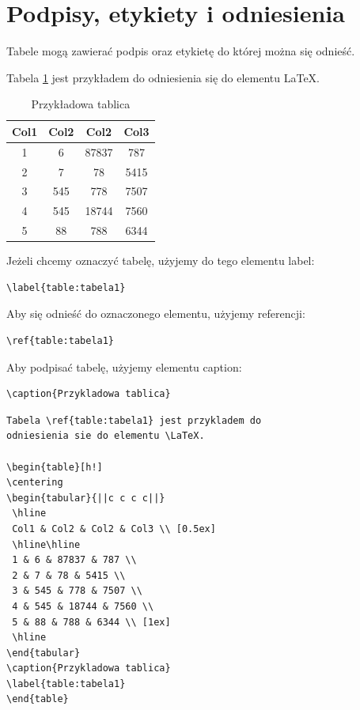 \documentclass[table]{beamer}
\begin{document}
\section{Podpisy, etykiety i odniesienia}
\begin{frame}
Tabele mogą zawierać podpis oraz etykietę do której można się odnieść.

Tabela \ref{table:tabela1} jest przykładem do odniesienia się do elementu \LaTeX.

\begin{table}[h!]
\centering
\begin{tabular}{||c c c c||} 
 \hline
 Col1 & Col2 & Col2 & Col3 \\ [0.5ex] 
 \hline\hline
 1 & 6 & 87837 & 787 \\ 
 2 & 7 & 78 & 5415 \\
 3 & 545 & 778 & 7507 \\
 4 & 545 & 18744 & 7560 \\
 5 & 88 & 788 & 6344 \\ [1ex] 
 \hline
\end{tabular}
\caption{Przykładowa tablica}
\label{table:tabela1}
\end{table}
\end{frame}

\begin{frame}[fragile]
Jeżeli chcemy oznaczyć tabelę, użyjemy do tego elementu label:
\begin{lstlisting}
\label{table:tabela1}
\end{lstlisting}
Aby się odnieść do oznaczonego elementu, użyjemy referencji:
\begin{lstlisting}
\ref{table:tabela1}
\end{lstlisting}
Aby podpisać tabelę, użyjemy elementu caption:
\begin{lstlisting}
\caption{Przykladowa tablica}
\end{lstlisting}
\end{frame}


\begin{frame}[fragile]
\small{
\begin{lstlisting}
Tabela \ref{table:tabela1} jest przykladem do
odniesienia sie do elementu \LaTeX.

\begin{table}[h!]
\centering
\begin{tabular}{||c c c c||} 
 \hline
 Col1 & Col2 & Col2 & Col3 \\ [0.5ex] 
 \hline\hline
 1 & 6 & 87837 & 787 \\ 
 2 & 7 & 78 & 5415 \\
 3 & 545 & 778 & 7507 \\
 4 & 545 & 18744 & 7560 \\
 5 & 88 & 788 & 6344 \\ [1ex] 
 \hline
\end{tabular}
\caption{Przykladowa tablica}
\label{table:tabela1}
\end{table}

\end{lstlisting}
}

\end{frame}
\end{document}
